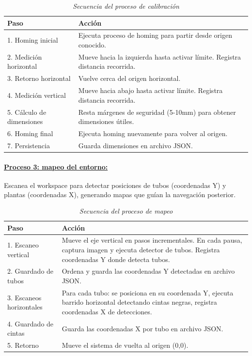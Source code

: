 \begin{table}[H]
\centering
\small
\begin{tabular}{|l|p{10cm}|}
\hline
Paso & Acción \\
\hline
1. Homing inicial & Ejecuta proceso de homing para partir desde origen conocido. \\
\hline
2. Medición horizontal & Mueve hacia la izquierda hasta activar límite. Registra distancia recorrida. \\
\hline
3. Retorno horizontal & Vuelve cerca del origen horizontal. \\
\hline
4. Medición vertical & Mueve hacia abajo hasta activar límite. Registra distancia recorrida. \\
\hline
5. Cálculo de dimensiones & Resta márgenes de seguridad (5-10mm) para obtener dimensiones útiles. \\
\hline
6. Homing final & Ejecuta homing nuevamente para volver al origen. \\
\hline
7. Persistencia & Guarda dimensiones en archivo JSON. \\
\hline
\end{tabular}
\caption{\textit{Secuencia del proceso de calibración}}
\label{tab:proceso_calibracion}
\end{table}

\paragraph{\underline{Proceso 3: mapeo del entorno:}}

Escanea el workspace para detectar posiciones de tubos (coordenadas Y) y plantas (coordenadas X), generando mapas que guían la navegación posterior.

\begin{table}[H]
\centering
\small
\begin{tabular}{|l|p{10cm}|}
\hline
Paso & Acción \\
\hline
1. Escaneo vertical & Mueve el eje vertical en pasos incrementales. En cada pausa, captura imagen y ejecuta detector de tubos. Registra coordenadas Y donde detecta tubos. \\
\hline
2. Guardado de tubos & Ordena y guarda las coordenadas Y detectadas en archivo JSON. \\
\hline
3. Escaneos horizontales & Para cada tubo: se posiciona en su coordenada Y, ejecuta barrido horizontal detectando cintas negras, registra coordenadas X de detecciones. \\
\hline
4. Guardado de cintas & Guarda las coordenadas X por tubo en archivo JSON. \\
\hline
5. Retorno & Mueve el sistema de vuelta al origen (0,0). \\
\hline
\end{tabular}
\caption{\textit{Secuencia del proceso de mapeo}}
\label{tab:proceso_mapeo}
\end{table}

